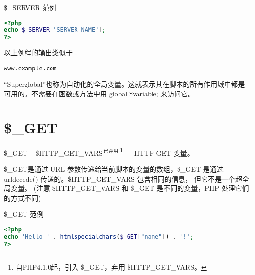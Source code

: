 
\begin{example}
\$\_SERVER 范例
\begin{lstlisting}[language=PHP]
<?php
echo $_SERVER['SERVER_NAME'];
?>
\end{lstlisting}
\end{example}

以上例程的输出类似于：

\begin{verbatim}
www.example.com
\end{verbatim}

“Superglobal”也称为自动化的全局变量。这就表示其在脚本的所有作用域中都是可用的。不需要在函数或方法中用 global \$variable; 来访问它。


\section{\$\_GET}



\$\_GET -- \$HTTP\_GET\_VARS$^{\text{[已弃用]}}$\footnote{自PHP4.1.0起，引入 \$\_GET，弃用 \$HTTP\_GET\_VARS。} — HTTP GET 变量。

\$\_GET是通过 URL 参数传递给当前脚本的变量的数组，\$\_GET 是通过 urldecode() 传递的。\$HTTP\_GET\_VARS 包含相同的信息， 但它不是一个超全局变量。 (注意 \$HTTP\_GET\_VARS 和 \$\_GET 是不同的变量，PHP 处理它们的方式不同)

\begin{example}
\$\_GET 范例
\begin{lstlisting}[language=PHP]
<?php
echo 'Hello ' . htmlspecialchars($_GET["name"]) . '!';
?>
\end{lstlisting}
\end{example}

